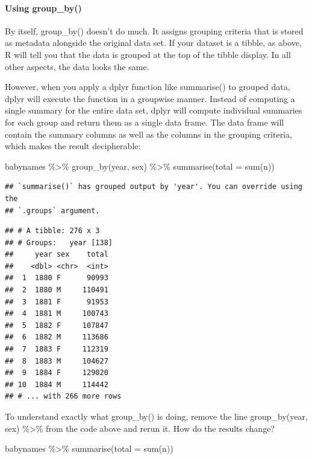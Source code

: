 \documentclass[
]{article}
\newenvironment{Shaded}{\begin{snugshade}}{\end{snugshade}}
\newcommand{\AttributeTok}[1]{\textcolor[rgb]{0.77,0.63,0.00}{#1}}
\newcommand{\FunctionTok}[1]{\textcolor[rgb]{0.00,0.00,0.00}{#1}}
\newcommand{\NormalTok}[1]{#1}
\newcommand{\SpecialCharTok}[1]{\textcolor[rgb]{0.00,0.00,0.00}{#1}}
\begin{document}
\hypertarget{using-group_by}{%
\paragraph{Using group\_by()}\label{using-group_by}}

By itself, group\_by() doesn't do much. It assigns grouping criteria
that is stored as metadata alongside the original data set. If your
dataset is a tibble, as above, R will tell you that the data is grouped
at the top of the tibble display. In all other aspects, the data looks
the same.

However, when you apply a dplyr function like summarise() to grouped
data, dplyr will execute the function in a groupwise manner. Instead of
computing a single summary for the entire data set, dplyr will compute
individual summaries for each group and return them as a single data
frame. The data frame will contain the summary columns as well as the
columns in the grouping criteria, which makes the result decipherable:

\begin{Shaded}
\begin{Highlighting}[]
\NormalTok{babynames }\SpecialCharTok{\%\textgreater{}\%}
  \FunctionTok{group\_by}\NormalTok{(year, sex) }\SpecialCharTok{\%\textgreater{}\%} 
  \FunctionTok{summarise}\NormalTok{(}\AttributeTok{total =} \FunctionTok{sum}\NormalTok{(n))}
\end{Highlighting}
\end{Shaded}

\begin{verbatim}
## `summarise()` has grouped output by 'year'. You can override using the
## `.groups` argument.
\end{verbatim}

\begin{verbatim}
## # A tibble: 276 x 3
## # Groups:   year [138]
##     year sex    total
##    <dbl> <chr>  <int>
##  1  1880 F      90993
##  2  1880 M     110491
##  3  1881 F      91953
##  4  1881 M     100743
##  5  1882 F     107847
##  6  1882 M     113686
##  7  1883 F     112319
##  8  1883 M     104627
##  9  1884 F     129020
## 10  1884 M     114442
## # ... with 266 more rows
\end{verbatim}

To understand exactly what group\_by() is doing, remove the line
group\_by(year, sex) \%\textgreater\% from the code above and rerun it.
How do the results change?

\begin{Shaded}
\begin{Highlighting}[]
\NormalTok{babynames }\SpecialCharTok{\%\textgreater{}\%}
  \FunctionTok{summarise}\NormalTok{(}\AttributeTok{total =} \FunctionTok{sum}\NormalTok{(n))}
\end{Highlighting}
\end{Shaded}
\end{document}

